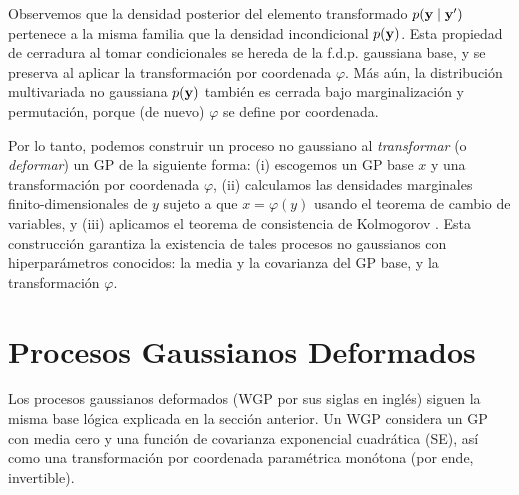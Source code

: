 Observemos que la densidad posterior del elemento transformado \(p(\mathbf{y} \mid \mathbf{y}')\) pertenece a la misma familia que la densidad incondicional \(p(\mathbf{y})\). Esta propiedad de cerradura al tomar condicionales se hereda de la f.d.p. gaussiana base, y se preserva al aplicar la transformación por coordenada \(\varphi\). Más aún, la distribución multivariada no gaussiana \(p(\mathbf{y})\) también es cerrada bajo marginalización y permutación, porque (de nuevo) \(\varphi\) se define por coordenada.

Por lo tanto, podemos construir un proceso no gaussiano al \emph{transformar} (o \emph{deformar}) un GP de la siguiente forma: (i) escogemos un GP base \(x\) y una transformación por coordenada \(\varphi\), (ii) calculamos las densidades marginales finito-dimensionales de \(y\) sujeto a que \(x = \varphi(y)\) usando el teorema de cambio de variables, y (iii) aplicamos el teorema de consistencia de Kolmogorov \cite{tao2011introduction}. Esta construcción garantiza la existencia de tales procesos no gaussianos con hiperparámetros conocidos: la media y la covarianza del GP base, y la transformación \(\varphi\).

\section{Procesos Gaussianos Deformados}
\label{sec:wgp}

Los procesos gaussianos deformados (WGP por sus siglas en inglés) \cite{snelson2004warped} siguen la misma base lógica explicada en la sección anterior. Un WGP considera un GP con media cero y una función de covarianza exponencial cuadrática (SE), así como una transformación por coordenada paramétrica monótona (por ende, invertible).

